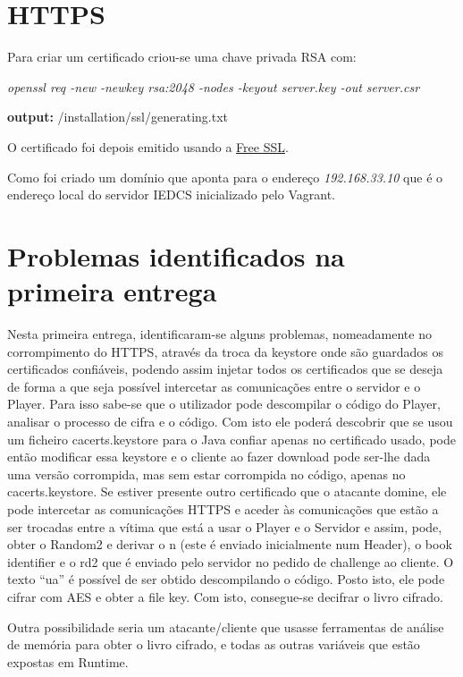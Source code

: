 \documentclass[pdftex,12pt,a4paper]{report}
\begin{document}
\section{HTTPS}
Para criar um certificado criou-se uma chave privada RSA com:

\textit{openssl req -new -newkey rsa:2048 -nodes -keyout server.key -out server.csr}

\textbf{output:} /installation/ssl/generating.txt

O certificado foi depois emitido usando a \href{https://www.instantssl.com/free-ssl-certificate.html}{Free SSL}.

Como foi criado um domínio que aponta para o endereço \textit{192.168.33.10} que é o endereço local do servidor IEDCS inicializado pelo Vagrant.

\section{Problemas identificados na primeira entrega}

Nesta primeira entrega, identificaram-se alguns problemas, nomeadamente no corrompimento do HTTPS, através da troca da keystore onde são guardados os certificados confiáveis, podendo assim injetar todos os certificados que se deseja de forma a que seja possível intercetar as comunicações entre o servidor e o Player. Para isso sabe-se que o utilizador pode descompilar o código do Player, analisar o processo de cifra e o código. Com isto ele poderá descobrir que se usou um ficheiro cacerts.keystore para o Java confiar apenas no certificado usado, pode então modificar essa keystore e o cliente ao fazer download pode ser-lhe dada uma versão corrompida, mas sem estar corrompida no código, apenas no cacerts.keystore. Se estiver presente outro certificado que o atacante domine, ele pode intercetar as comunicações HTTPS e aceder às comunicações que estão a ser trocadas entre a vítima que está a usar o Player e o Servidor e assim, pode, obter o Random2 e derivar o n (este é enviado inicialmente num Header), o book identifier e o rd2 que é enviado pelo servidor no pedido de challenge ao cliente. O texto “ua” é possível de ser obtido descompilando o código. Posto isto, ele pode cifrar com AES e obter a file key. Com isto, consegue-se decifrar o livro cifrado.

Outra possibilidade seria um atacante/cliente que usasse ferramentas de análise de memória para obter o livro cifrado, e todas as outras variáveis que estão expostas em Runtime.
\end{document}
